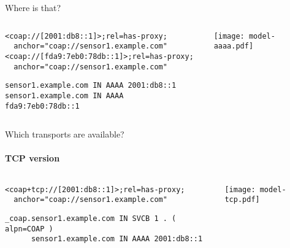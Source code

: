 \begin{frame}[fragile]{Where is that?}
    \begin{columns}
        \begin{column}{0.7\textwidth}
\begin{verbatim}
<coap://[2001:db8::1]>;rel=has-proxy;
  anchor="coap://sensor1.example.com"
<coap://[fda9:7eb0:78db::1]>;rel=has-proxy;
  anchor="coap://sensor1.example.com"
\end{verbatim}
           
            \vspace{1cm}

\begin{verbatim}
sensor1.example.com IN AAAA 2001:db8::1
sensor1.example.com IN AAAA fda9:7eb0:78db::1
\end{verbatim}
        \end{column}
        \begin{column}{0.3\textwidth}
            \texttt{[image: model-aaaa.pdf]}
        \end{column}
    \end{columns}
\end{frame}

\begin{frame}[fragile]{Which transports are available?}
    \framesubtitle{TCP version}
    \begin{columns}
        \begin{column}{0.7\textwidth}
\begin{verbatim}
<coap+tcp://[2001:db8::1]>;rel=has-proxy;
  anchor="coap://sensor1.example.com"
\end{verbatim}
           
            \vspace{1cm}

\begin{verbatim}
_coap.sensor1.example.com IN SVCB 1 . ( alpn=COAP )
      sensor1.example.com IN AAAA 2001:db8::1
\end{verbatim}
        \end{column}
        \begin{column}{0.3\textwidth}
            \texttt{[image: model-tcp.pdf]}
        \end{column}
    \end{columns}
\end{frame}

